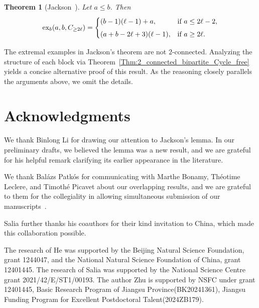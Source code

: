 \documentclass[11pt,a4paper]{article}
\newtheorem{theorem}{Theorem}%
\newcommand{\ex}{{\rm ex}}
\begin{document}
\begin{theorem}[Jackson~\cite{jackson1985long}]\label{thm:jackson}
Let $a \le b$. Then
\[
\ex_b(a,b, C_{\ge 2\ell}) =
\begin{cases}
  (b - 1)(\ell - 1) + a, & \text{if } a \le 2\ell - 2, \\[4pt]
  (a + b - 2\ell + 3)(\ell - 1), & \text{if } a \ge 2\ell.
\end{cases}
\]
\end{theorem}

The extremal examples in Jackson’s theorem are not $2$-connected. Analyzing the structure of each block via Theorem~\ref{Thm:2_connected_bipartite_Cycle_free} yields a concise alternative proof of this result.  
As the reasoning closely parallels the arguments above, we omit the details.

\section*{Acknowledgments}


We thank Binlong Li for drawing our attention to Jackson’s lemma.
In our preliminary drafts, we believed the lemma was a new result, and we are grateful for his helpful remark clarifying its earlier appearance in the literature.

We thank Balázs Patkós for communicating with Marthe Bonamy, Théotime Leclere, and Timothé Picavet about our overlapping results, and we are grateful to them for the collegiality in allowing simultaneous submission of our manuscripts~\cite{Bonamy2025}.

Salia further thanks his coauthors for their kind invitation to China, which made this collaboration possible.

The research of He was supported by the Beijing Natural Science Foundation, grant 1244047, and the National Natural Science Foundation of China, grant 12401445. 
The research of Salia was supported by the National Science Centre grant 2021/42/E/ST1/00193.
The author Zhu is supported by NSFC under grant 12401445, Basic Research Program of Jiangsu Province(BK20241361), Jiangsu Funding Program for Excellent Postdoctoral Talent(2024ZB179).





\end{document}
